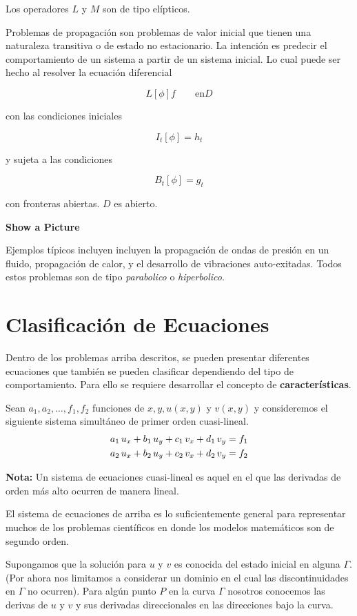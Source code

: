 Los operadores $L$ y $M$ son de tipo elípticos.

Problemas de propagación son problemas de valor inicial que tienen una naturaleza transitiva o de estado no estacionario. La intención es predecir el comportamiento de un sistema a partir de un sistema inicial. Lo cual puede ser hecho al resolver la ecuación diferencial

\[ L[\phi] f \qquad \text{en} D \]

con las condiciones iniciales

\[ I_t[\phi] = h_t \]

y sujeta a las condiciones

\[ B_t[\phi] = g_t \]

con fronteras abiertas. $D$ es abierto. 

\textbf{Show a Picture}

Ejemplos típicos incluyen incluyen la propagación de ondas de presión en un fluido, propagación de calor, y el desarrollo de vibraciones auto-exitadas. Todos estos problemas son de tipo \textit{parabolico} o \textit{hiperbolico}.

\section{Clasificación de Ecuaciones}

Dentro de los problemas arriba descritos, se pueden presentar diferentes ecuaciones que también se pueden clasificar dependiendo del tipo de comportamiento. Para ello se requiere desarrollar el concepto de \textbf{características}.

Sean $a_1, a_2, \dots, f_1, f_2$ funciones de $x,y, u(x,y)$ y $v(x,y)$ y consideremos el siguiente sistema simultáneo de primer orden cuasi-lineal.
\begin{align*}
a_1 \thinspace u_x + b_1 \thinspace u_y + c_1 \thinspace v_x + d_1 \thinspace v_y &= f_1 \\
a_2 \thinspace u_x + b_2 \thinspace u_y + c_2 \thinspace v_x + d_2 \thinspace v_y &= f_2
\end{align*}

\textbf{Nota:} Un sistema de ecuaciones cuasi-lineal es aquel en el que las derivadas de orden más alto ocurren de manera lineal.

El sistema de ecuaciones de arriba es lo suficientemente general para representar muchos de los problemas científicos en donde los modelos matemáticos son de segundo orden.

Supongamos que la solución para $u$ y $v$ es conocida del estado inicial en alguna $\Gamma$. (Por ahora nos limitamos a considerar un dominio en el cual las discontinuidades en $\Gamma$ no ocurren). Para algún punto $P$ en la curva $\Gamma$ nosotros conocemos las derivas de $u$ y $v$ y sus derivadas direccionales en las direcciones bajo la curva.

